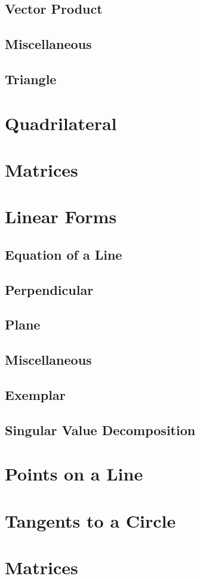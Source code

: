 \documentclass[journal]{IEEEtran}
\begin{document}
\subsection{Vector Product}

\newpage
\subsection{Miscellaneous}

\newpage
\subsection{Triangle}

\newpage
\section{ Quadrilateral}

\newpage
\section{Matrices}

\newpage
\section{Linear Forms}
\subsection{Equation of a Line}

\newpage
\subsection{Perpendicular}

\newpage
\subsection{Plane}
%
\newpage
\subsection{Miscellaneous }
%
\newpage
\subsection{Exemplar}
%
\newpage
\subsection{Singular Value Decomposition}
%
\appendices
\section{Points on a Line}

\newpage
\section{Tangents to a Circle}

\section{Matrices}

\end{document}
